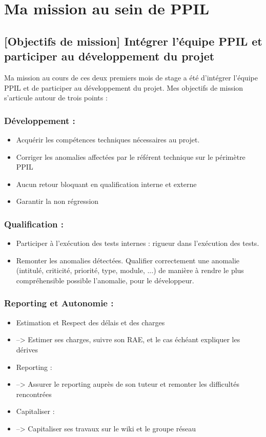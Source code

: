 \chapter{Ma mission au sein de PPIL}
\label{sec:unchapitre}

\section{[Objectifs de mission] Intégrer l'équipe PPIL et participer au développement du projet}
Ma mission au cours de ces deux premiers mois de stage a été d'intégrer l'équipe PPIL et de participer au développement du projet. Mes objectifs de mission s'articule autour de trois points :
\subsection{Développement :} 
\begin{itemize}
    \item Acquérir les compétences techniques nécessaires au projet.
    \item Corriger les anomalies affectées par le référent technique sur le périmètre PPIL 
    \item Aucun retour bloquant en qualification interne et externe 
    \item Garantir la non régression
\end{itemize}
\subsection{Qualification : } 
\begin{itemize}
    \item Participer à l'exécution des tests internes : rigueur dans l'exécution des tests.
    \item Remonter les anomalies détectées. Qualifier correctement une anomalie (intitulé, criticité, priorité, type, module, ...) de manière à rendre le plus compréhensible possible l'anomalie, pour le développeur.
\end{itemize}
\subsection{Reporting et Autonomie :} 
\begin{itemize}
    \item Estimation et Respect des délais et des charges
    \item --> Estimer ses charges, suivre son RAE, et le cas échéant expliquer les dérives 
    \item Reporting :
    \item --> Assurer le reporting auprès de son tuteur et remonter les difficultés rencontrées
    \item Capitaliser : 
    \item --> Capitaliser ses travaux sur le wiki et le groupe réseau
\end{itemize}
